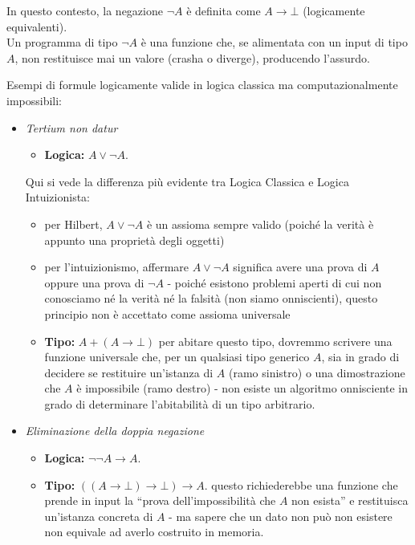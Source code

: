 \documentclass[a4paper,11pt]{report}
\begin{document}
\begin{gframe}{}
    In questo contesto, la negazione $\neg A$ è definita come $A \to \bot$ (logicamente equivalenti). \\
    Un programma di tipo $\neg A$ è una funzione che, se alimentata con un input di tipo $A$, non restituisce mai un valore (crasha o diverge), producendo l'assurdo.
\end{gframe}

Esempi di formule logicamente valide in logica classica ma computazionalmente impossibili:

\begin{itemize}
    \item \textit{Tertium non datur}

        \begin{itemize}
        \item \textbf{Logica:} $A \lor \neg A$.
        \end{itemize}

        Qui si vede la differenza più evidente tra Logica Classica e Logica Intuizionista:
\begin{itemize}
    \item per Hilbert, $A \lor \neg A$ è un assioma sempre valido (poiché la verità è appunto una proprietà degli oggetti)
    \item per l'intuizionismo, affermare $A \lor \neg A$ significa avere una prova di $A$ oppure una prova di $\neg A$ -  poiché esistono problemi aperti di cui non conosciamo né la verità né la falsità (non siamo onniscienti), questo principio non è accettato come assioma universale
\end{itemize}

    \begin{itemize}

        \item \textbf{Tipo:} $A + (A \to \bot)$
        \subitem per abitare questo tipo, dovremmo scrivere una funzione universale che, per un qualsiasi tipo generico $A$, sia in grado di decidere se restituire un'istanza di $A$ (ramo sinistro) o una dimostrazione che $A$ è impossibile (ramo destro) - non esiste un algoritmo onnisciente in grado di determinare l'abitabilità di un tipo arbitrario.
    \end{itemize}

    \item \textit{Eliminazione della doppia negazione}
    \begin{itemize}
        \item \textbf{Logica:} $\neg \neg A \to A$. 
        \item \textbf{Tipo:} $((A \to \bot) \to \bot) \to A$.
        \subitem questo richiederebbe una funzione che prende in input la ``prova dell'impossibilità che $A$ non esista'' e restituisca un'istanza concreta di $A$ - ma sapere che un dato non può non esistere non equivale ad averlo costruito in memoria.
    \end{itemize}
    

\end{itemize}
\end{document}
